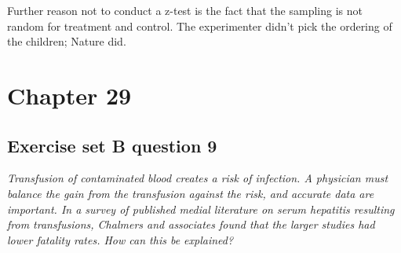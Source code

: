\documentclass[11pt]{article}
\begin{document}
Further reason not to conduct a z-test is the fact that the sampling is not random for treatment and control. The experimenter didn't pick the ordering of the children; Nature did.



\section*{Chapter 29}


\subsection*{Exercise set B question 9} %
\textit{Transfusion of contaminated blood creates a risk of infection. A physician must balance the gain from the transfusion against the risk, and accurate data are important. In a survey of published medial literature on serum hepatitis resulting from transfusions, Chalmers and associates found that the larger studies had lower fatality rates. How can this be explained?}\\
\end{document}
